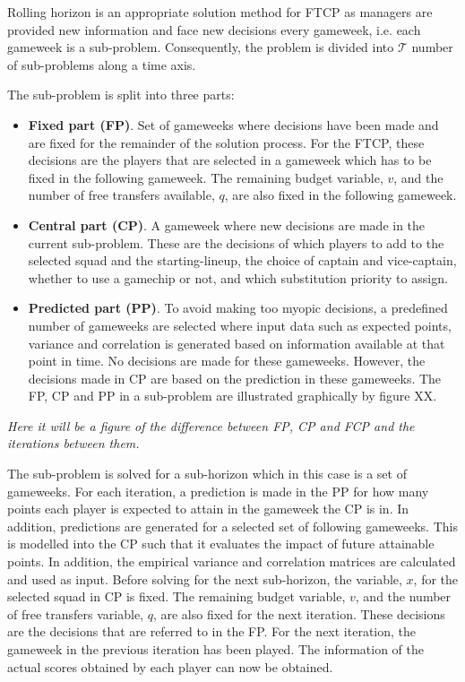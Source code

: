 Rolling horizon is an appropriate solution method for FTCP as managers are provided new information and face new decisions every gameweek, i.e. each gameweek is a sub-problem. Consequently, the problem is divided into $\mathcal{T}$ number of sub-problems along a time axis. 

\newpar

The sub-problem is split into three parts:
\begin{itemize}
    \item \textbf{Fixed part (FP)}. Set of gameweeks where decisions have been made and are fixed for the remainder of the solution process. For the FTCP, these decisions are the players that are selected in a gameweek which has to be fixed in the following gameweek. The remaining budget variable, $v$, and the number of free transfers available, $q$, are also fixed in the following gameweek.
    \item \textbf{Central part (CP)}. A gameweek where new decisions are made in the current sub-problem. These are the decisions of which players to add to the selected squad and the starting-lineup, the choice of captain and vice-captain, whether to use a gamechip or not, and which substitution priority to assign. 
    \item \textbf{Predicted part (PP)}. To avoid making too myopic decisions, a predefined number of gameweeks are selected where input data such as expected points, variance and correlation is generated based on information available at that point in time. No decisions are made for these gameweeks. However, the decisions made in CP are based on the prediction in these gameweeks. The FP, CP and PP in a sub-problem are illustrated graphically by figure XX.
\end{itemize}

\newpar

\textit{Here it will be a figure of the difference between FP, CP and FCP and the iterations between them.}

\newpar

The sub-problem is solved for a sub-horizon which in this case is a set of gameweeks. For each iteration, a prediction is made in the PP for how many points each player is expected to attain in the gameweek the CP is in. In addition, predictions are generated for a selected set of following gameweeks. This is modelled into the CP such that it evaluates the impact of future attainable points. In addition, the empirical variance and correlation matrices are calculated and used as input. Before solving for the next sub-horizon, the variable, $x$, for the selected squad in CP is fixed. The remaining budget variable, $v$, and the number of free transfers variable, $q$, are also fixed for the next iteration. These decisions are the decisions that are referred to in the FP. For the next iteration, the gameweek in the previous iteration has been played. The information of the actual scores obtained by each player can now be obtained. 

